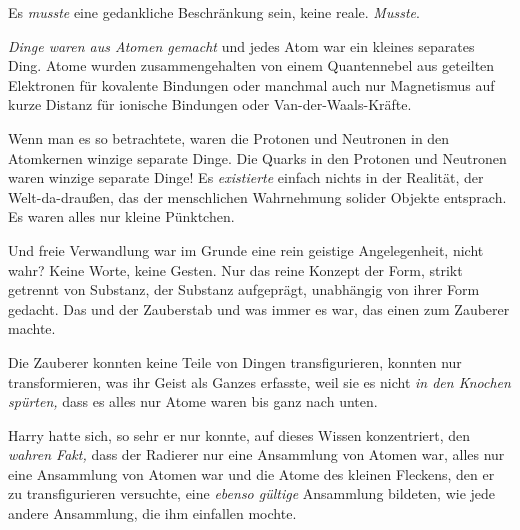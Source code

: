 Es \emph{musste} eine gedankliche Beschränkung sein, keine reale. \emph{Musste}.

\emph{Dinge waren aus Atomen gemacht} und jedes Atom war ein kleines separates Ding. Atome wurden zusammengehalten von einem Quantennebel aus geteilten Elektronen für kovalente Bindungen oder manchmal auch nur Magnetismus auf kurze Distanz für ionische Bindungen oder Van-der-Waals-Kräfte.

Wenn man es so betrachtete, waren die Protonen und Neutronen in den Atomkernen winzige separate Dinge. Die Quarks in den Protonen und Neutronen waren winzige separate Dinge! Es \emph{existierte} einfach nichts in der Realität, der Welt-da-draußen, das der menschlichen Wahrnehmung solider Objekte entsprach. Es waren alles nur kleine Pünktchen.

Und freie Verwandlung war im Grunde eine rein geistige Angelegenheit, nicht wahr? Keine Worte, keine Gesten. Nur das reine Konzept der Form, strikt getrennt von Substanz, der Substanz aufgeprägt, unabhängig von ihrer Form gedacht. Das und der Zauberstab und was immer es war, das einen zum Zauberer machte.

Die Zauberer konnten keine Teile von Dingen transfigurieren, konnten nur transformieren, was ihr Geist als Ganzes erfasste, weil sie es nicht \emph{in den Knochen spürten,} dass es alles nur Atome waren bis ganz nach unten.

Harry hatte sich, so sehr er nur konnte, auf dieses Wissen konzentriert, den \emph{wahren Fakt,} dass der Radierer nur eine Ansammlung von Atomen war, alles nur eine Ansammlung von Atomen war und die Atome des kleinen Fleckens, den er zu transfigurieren versuchte, eine \emph{ebenso gültige} Ansammlung bildeten, wie jede andere Ansammlung, die ihm einfallen mochte.

